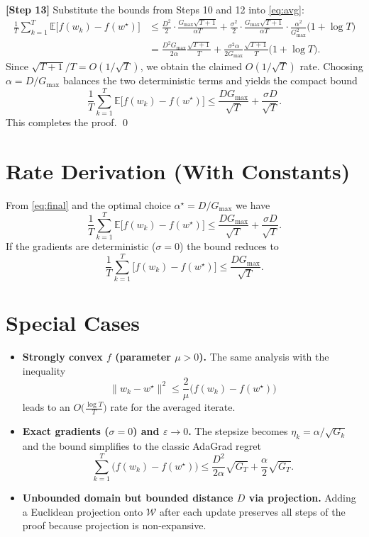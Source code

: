 \documentclass{article}
\newcommand{\E}{\mathbb{E}}
\begin{document}
\noindent\textbf{[Step 13]} Substitute the bounds from Steps 10 and 12 into \eqref{eq:avg}:
\begin{align}
\frac{1}{T}\sum_{k=1}^{T}\E\!\big[f(w_k)-f(w^{\star})\big]
&\le \frac{D^{2}}{2}\cdot\frac{G_{\max}\sqrt{T+1}}{\alpha T}
   +\frac{\sigma^{2}}{2}\cdot\frac{G_{\max}\sqrt{T+1}}{\alpha T}
     \cdot\frac{\alpha^{2}}{G_{\max}^{2}}\big(1+\log T\big) \nonumber\\[4pt]
&= \frac{D^{2}G_{\max}}{2\alpha}\frac{\sqrt{T+1}}{T}
   +\frac{\sigma^{2}\alpha}{2G_{\max}}\frac{\sqrt{T+1}}{T}\big(1+\log T\big). \label{eq:final}
\end{align}
Since $\sqrt{T+1}/T = O(1/\sqrt{T})$, we obtain the claimed $O(1/\sqrt{T})$ rate. Choosing $\alpha = D/G_{\max}$ balances the two deterministic terms and yields the compact bound
\[
\frac{1}{T}\sum_{k=1}^{T}\E\!\big[f(w_k)-f(w^{\star})\big]
\le \frac{DG_{\max}}{\sqrt{T}} + \frac{\sigma D}{\sqrt{T}} .
\]
This completes the proof. \qed

\section*{Rate Derivation (With Constants)}
From \eqref{eq:final} and the optimal choice $\alpha^{\star}=D/G_{\max}$ we have
\[
\boxed{
\frac{1}{T}\sum_{k=1}^{T}\E\!\big[f(w_k)-f(w^{\star})\big]
\le
\frac{DG_{\max}}{\sqrt{T}} + \frac{\sigma D}{\sqrt{T}} }.
\]
If the gradients are deterministic ($\sigma=0$) the bound reduces to
\[
\frac{1}{T}\sum_{k=1}^{T}\big[f(w_k)-f(w^{\star})\big]
\le \frac{DG_{\max}}{\sqrt{T}} .
\]

\section*{Special Cases}
\begin{itemize}
\item \textbf{Strongly convex $f$ (parameter $\mu>0$).} The same analysis with the inequality
\[
\|w_k-w^{\star}\|^{2}\le \frac{2}{\mu}\big(f(w_k)-f(w^{\star})\big)
\]
leads to an $O\!\big(\frac{\log T}{T}\big)$ rate for the averaged iterate.
\item \textbf{Exact gradients ($\sigma=0$) and $\varepsilon\to0$.} The stepsize becomes $\eta_k=\alpha/\sqrt{G_k}$ and the bound simplifies to the classic AdaGrad regret
\[
\sum_{k=1}^{T}\big(f(w_k)-f(w^{\star})\big)
\le \frac{D^{2}}{2\alpha}\sqrt{G_T}+\frac{\alpha}{2}\sqrt{G_T}.
\]
\item \textbf{Unbounded domain but bounded distance $D$ via projection.} Adding a Euclidean projection onto $\mathcal{W}$ after each update preserves all steps of the proof because projection is non‑expansive.
\end{itemize}
\end{document}
